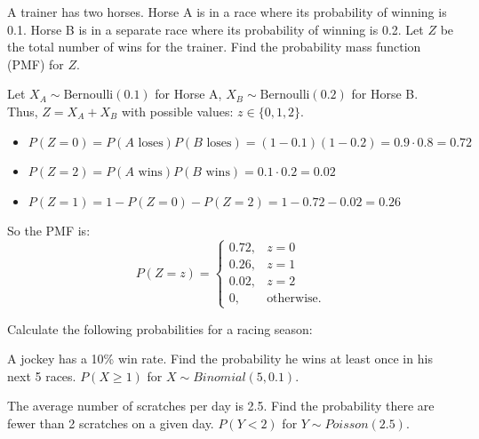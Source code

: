 \documentclass[a4paper, 10pt]{article}
\begin{document}
\newpage

\begin{problem}
A trainer has two horses. Horse A is in a race where its probability of winning is 0.1.
Horse B is in a separate race where its probability of winning is 0.2.
Let \( Z \) be the total number of wins for the trainer.
Find the probability mass function (PMF) for \( Z \).
\end{problem}

\begin{tosubmit}
	Let \( X_A\sim \text{Bernoulli}(0.1) \) for Horse A, \( X_B\sim \text{Bernoulli}(0.2) \) for Horse B. \\
	Thus, \( Z=X_A + X_B \) with possible values: \( z\in\{0, 1, 2\} \).

	\begin{itemize}
		\item \( P(Z=0)=P(A\text{ loses})P(B\text{ loses})=(1-0.1)(1-0.2)=0.9\cdot0.8=0.72 \)
		\item \( P(Z=2)=P(A\text{ wins})P(B\text{ wins})=0.1\cdot0.2=0.02 \)
		\item \( P(Z=1)=1-P(Z=0)-P(Z=2)=1-0.72-0.02=0.26 \)
	\end{itemize}

	So the PMF is:
	\[\boxed{
			P(Z = z) =
			\begin{cases}
				0.72, & z=0               \\
				0.26, & z=1               \\
				0.02, & z=2               \\
				0,    & \text{otherwise.}
			\end{cases}
		}\]
\end{tosubmit}

\begin{problem}
Calculate the following probabilities for a racing season:
\begin{subproblems_alpha}
	\item A jockey has a 10\% win rate. Find the probability he wins at least once in his next 5 races.
	\( P(X \geq 1) \) for \( X \sim Binomial(5, 0.1) \).
	\item The average number of scratches per day is 2.5. Find the probability there are fewer than 2 scratches on a given day.
	\( P(Y < 2) \) for \( Y \sim Poisson(2.5) \).
\end{subproblems_alpha}
\end{problem}
\end{document}

